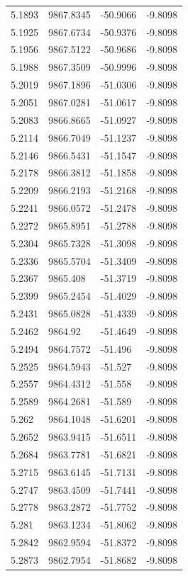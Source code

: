 \begin{table}[H]
\begin{tabular}{llll}
5.1893 & 9867.8345 & -50.9066 & -9.8098 \\
5.1925 & 9867.6734 & -50.9376 & -9.8098 \\
5.1956 & 9867.5122 & -50.9686 & -9.8098 \\
5.1988 & 9867.3509 & -50.9996 & -9.8098 \\
5.2019 & 9867.1896 & -51.0306 & -9.8098 \\
5.2051 & 9867.0281 & -51.0617 & -9.8098 \\
5.2083 & 9866.8665 & -51.0927 & -9.8098 \\
5.2114 & 9866.7049 & -51.1237 & -9.8098 \\
5.2146 & 9866.5431 & -51.1547 & -9.8098 \\
5.2178 & 9866.3812 & -51.1858 & -9.8098 \\
5.2209 & 9866.2193 & -51.2168 & -9.8098 \\
5.2241 & 9866.0572 & -51.2478 & -9.8098 \\
5.2272 & 9865.8951 & -51.2788 & -9.8098 \\
5.2304 & 9865.7328 & -51.3098 & -9.8098 \\
5.2336 & 9865.5704 & -51.3409 & -9.8098 \\
5.2367 & 9865.408 & -51.3719 & -9.8098 \\
5.2399 & 9865.2454 & -51.4029 & -9.8098 \\
5.2431 & 9865.0828 & -51.4339 & -9.8098 \\
5.2462 & 9864.92 & -51.4649 & -9.8098 \\
5.2494 & 9864.7572 & -51.496 & -9.8098 \\
5.2525 & 9864.5943 & -51.527 & -9.8098 \\
5.2557 & 9864.4312 & -51.558 & -9.8098 \\
5.2589 & 9864.2681 & -51.589 & -9.8098 \\
5.262 & 9864.1048 & -51.6201 & -9.8098 \\
5.2652 & 9863.9415 & -51.6511 & -9.8098 \\
5.2684 & 9863.7781 & -51.6821 & -9.8098 \\
5.2715 & 9863.6145 & -51.7131 & -9.8098 \\
5.2747 & 9863.4509 & -51.7441 & -9.8098 \\
5.2778 & 9863.2872 & -51.7752 & -9.8098 \\
5.281 & 9863.1234 & -51.8062 & -9.8098 \\
5.2842 & 9862.9594 & -51.8372 & -9.8098 \\
5.2873 & 9862.7954 & -51.8682 & -9.8098 \\

\end{tabular}
\end{table}
